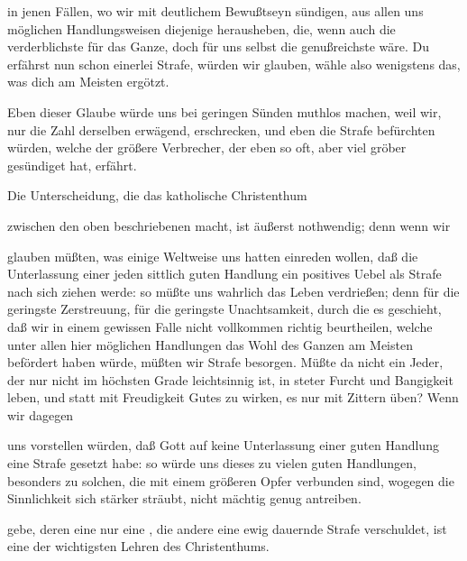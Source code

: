 \begin{aufza}
\begin{aufzb}
\item in jenen Fällen, wo wir mit deutlichem Bewußtseyn sündigen, aus allen uns möglichen Handlungsweisen diejenige herausheben, die, wenn auch die verderblichste für das Ganze, doch für uns selbst die genußreichste wäre. Du erfährst nun schon einerlei Strafe, würden wir glauben, wähle also wenigstens das, was dich am Meisten ergötzt.
\item Eben dieser Glaube würde uns bei geringen Sünden muthlos machen, weil wir, nur die Zahl derselben erwägend, erschrecken, und eben die Strafe befürchten würden, welche der größere Verbrecher, der eben so oft, aber viel gröber gesündiget hat, erfährt.
\end{aufzb}
\item Die Unterscheidung, die das katholische Christenthum
\begin{aufzb}
\item zwischen den oben beschriebenen  macht, ist äußerst nothwendig; denn wenn wir
\begin{aufzc}
\item glauben müßten, was einige Weltweise uns hatten einreden wollen, daß die Unterlassung einer jeden sittlich guten Handlung ein positives Uebel als Strafe nach sich ziehen werde: so müßte uns wahrlich das Leben verdrießen; denn für die geringste Zerstreuung, für die geringste Unachtsamkeit, durch die es geschieht, daß wir in einem gewissen Falle nicht vollkommen richtig beurtheilen, welche unter allen hier möglichen Handlungen das Wohl des Ganzen am Meisten befördert haben würde, müßten wir Strafe besorgen. Müßte da nicht ein Jeder, der nur nicht im höchsten Grade leichtsinnig ist, in steter Furcht und Bangigkeit leben, und statt mit Freudigkeit Gutes zu wirken, es nur mit Zittern üben? Wenn wir dagegen 
\item uns vorstellen würden, daß Gott auf keine Unterlassung einer guten Handlung eine Strafe gesetzt habe: so würde uns dieses zu vielen guten Handlungen, besonders zu solchen, die mit einem größeren Opfer verbunden sind, wogegen die Sinnlichkeit sich stärker sträubt, nicht mächtig genug antreiben.
\end{aufzc}
\item {} gebe, deren eine nur eine , die andere eine ewig dauernde Strafe verschuldet, ist eine der wichtigsten Lehren des Christenthums.~
\begin{aufzc}

\end{aufzc}
\end{aufzb}
\end{aufza}
